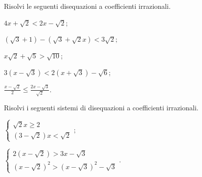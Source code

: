 \begin{esercizio}[\Ast]
 \label{ese:2.83}
Risolvi le seguenti disequazioni a coefficienti irrazionali.
 \begin{multicols}{2}
 \begin{enumeratea}
 \item $4x+\sqrt 2<2x-\sqrt 2$;
 \item $(\sqrt 3+1)-(\sqrt 3+\sqrt 2x)<3\sqrt 2$;
 \item $x\sqrt 2+\sqrt 5>\sqrt{10}$;
 \item $3(x-\sqrt 3)<2(x+\sqrt 3)-\sqrt 6$;
 \item $\frac{x-\sqrt 2} 2\le \frac{2x-\sqrt 3}{\sqrt 2}$.
 \end{enumeratea}
 \end{multicols}
\end{esercizio}

\begin{esercizio}[\Ast]
 \label{ese:2.84}
Risolvi i seguenti sistemi di disequazioni a coefficienti irrazionali.
 \begin{multicols}{2}
 \begin{enumeratea}
 \item $\left\{\begin{array}{l}\sqrt 2x\ge 2\\
 (3-\sqrt 2)x<\sqrt 2 \end{array}\right.;$
 \item $\left\{\begin{array}{l}2(x-\sqrt 2)>3x-\sqrt 3\\
 (x-\sqrt 2)^2>(x-\sqrt 3)^2-\sqrt 3 \end{array}\right..$
 \end{enumeratea}
 \end{multicols}
\end{esercizio}


